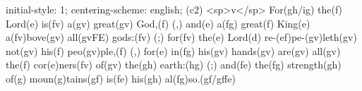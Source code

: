 initial-style: 1;
centering-scheme: english;
(c2) <sp>v</sp> For(gh/ig) the(f) Lord(e) is(fv) a(gv) great(gv) God,(f) (,) and(e) a(fg) great(f) King(e) a(fv)bove(gv) all(gvFE) gods:(fv) (;) for(fv) the(e) Lord(d) re-(ef)pe-(gv)leth(gv) not(gv) his(f) peo(gv)ple,(f) (,) for(e) in(fg) his(gv) hands(gv) are(gv) all(gv) the(f) cor(e)ners(fv) of(gv) the(gh) earth:(hg) (;) and(fe) the(fg) strength(gh) of(g) moun(g)tains(gf) is(fe) his(gh) al(fg)so.(gf/gffe)
